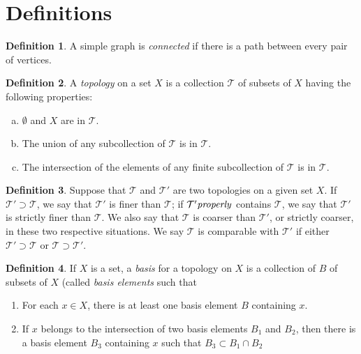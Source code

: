 \documentclass[12pt]{article}
\theoremstyle{definition}
\newtheorem{definition}{Definition}
\theoremstyle{theorem}
\begin{document}
\section{Definitions}
\begin{definition}\label{def: simple connected graph}\cite{edelsbrunner2010computational}
	A simple graph is \emph{connected} if there is a path between every pair of vertices.
\end{definition}

\begin{definition}\label{def: topology}\cite{munkres2000topology}
	A \emph{topology} on a set \(X\) is a collection \(\mathcal{T}\) of subsets of \(X\) having the following properties:
	\begin{enumerate}[(a)]
		\item \(\emptyset\) and \(X\) are in \(\mathcal{T}\).
		\item The union of any subcollection of \(\mathcal{T}\) is in \(\mathcal{T}\).
		\item The intersection of the elements of any finite subcollection of \(\mathcal{T}\) is in \(\mathcal{T}\).
	\end{enumerate}
\end{definition}

\begin{definition}\label{def: finer coarser comparable}\cite{munkres2000topology}
	Suppose that $\mathcal{T}$ and $\mathcal{T}'$ are two topologies on a given set $X$. If $\mathcal{T}' \supset \mathcal{T}$, we say that $\mathcal{T}'$ is finer than $\mathcal{T}$; if $\mathcal{T}' \it{properly}$ contains $\mathcal{T}$, we say that $\mathcal{T}'$ is strictly finer than $\mathcal{T}$. We also say that $\mathcal{T}$ is coarser than $\mathcal{T}'$, or strictly coarser, in these two respective situations. We say $\mathcal{T}$ is comparable with $\mathcal{T}'$ if either $\mathcal{T}' \supset \mathcal{T}$ or $\mathcal{T} \supset \mathcal{T}'$.
\end{definition}

\begin{definition}\label{def: basis for a topology}\cite{munkres2000topology}
If \(X\) is a set, a \emph{basis} for a topology on \(X\) is a collection of $\mathit{B}$ of subsets of \(X\) (called \emph{basis elements} such that 
\begin{enumerate}[(1)]
\item For each $x \in X$, there is at least one basis element $B$ containing $x$. 
\item If $x$ belongs to the intersection of two  basis elements $B_1$ and $B_2$, then there is a basis element $B_3$ containing $x$ such that $B_3 \subset B_1 \cap B_2$
\end{enumerate}
\end{definition} 
\end{document}
